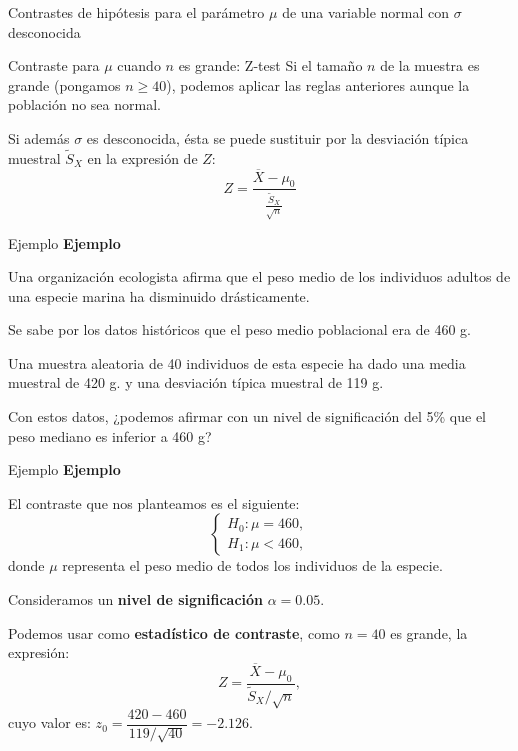 \documentclass[
  ignorenonframetext,
]{beamer}
\begin{document}
\begin{frame}{Contrastes de hipótesis para el parámetro \(\mu\) de una
variable normal con \(\sigma\) desconocida}
\protect\hypertarget{contrastes-de-hipuxf3tesis-para-el-paruxe1metro-mu-de-una-variable-normal-con-sigma-desconocida}{}
\end{frame}

\begin{frame}{Contraste para \(\mu\) cuando \(n\) es grande: Z-test}
\protect\hypertarget{contraste-para-mu-cuando-n-es-grande-z-test}{}
Si el tamaño \(n\) de la muestra es grande (pongamos \(n\geq 40\)),
podemos aplicar las reglas anteriores aunque la población no sea normal.

Si además \(\sigma\) es desconocida, ésta se puede sustituir por la
desviación típica muestral \(\widetilde{S}_X\) en la expresión de \(Z\):
\[
Z=\frac{\overline{X}-\mu_0}
{\frac{\widetilde{S}_X}{\sqrt{n}}}
\]
\end{frame}

\begin{frame}{Ejemplo}
\protect\hypertarget{ejemplo-5}{}
\textbf{Ejemplo}

Una organización ecologista afirma que el peso medio de los individuos
adultos de una especie marina ha disminuido drásticamente.

Se sabe por los datos históricos que el peso medio poblacional era de
460 g.

Una muestra aleatoria de 40 individuos de esta especie ha dado una media
muestral de 420 g. y una desviación típica muestral de 119 g.

Con estos datos, ¿podemos afirmar con un nivel de significación del 5\%
que el peso mediano es inferior a 460 g?
\end{frame}

\begin{frame}{Ejemplo}
\protect\hypertarget{ejemplo-6}{}
\textbf{Ejemplo}

El contraste que nos planteamos es el siguiente:
\[\left\{\begin{array}{l}
H_0:\mu=460,\\
H_1:\mu<460,
\end{array}
\right.\] donde \(\mu\) representa el peso medio de todos los individuos
de la especie.

Consideramos un \textbf{nivel de significación} \(\alpha=0.05\).

Podemos usar como \textbf{estadístico de contraste}, como \(n=40\) es
grande, la expresión: \[
Z=\frac{\overline{X}-\mu_0}{{\widetilde{S}_X}/{\sqrt{n}}},
\] cuyo valor es: \(z_0=\dfrac{420-460}{{119}/{\sqrt{40}}}=-2.126.\)
\end{frame}
\end{document}
